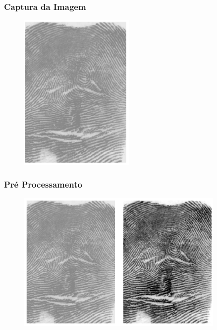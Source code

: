 \documentclass{beamer}
\begin{document}
\begin{frame}
\frametitle{Captura da Imagem}

	\begin{figure}[!h]
		\begin{center}
			\includegraphics[width=0.5\textwidth]{Figures/digital}
		\end{center}
		
	\end{figure}
	
\end{frame}



\begin{frame}
\frametitle{Pré Processamento}

	\begin{figure}[!h]
		\begin{center}
			\includegraphics[width=0.9\textwidth]{Figures/prepros}
		\end{center}
		
	\end{figure}
	
\end{frame}
\end{document}
